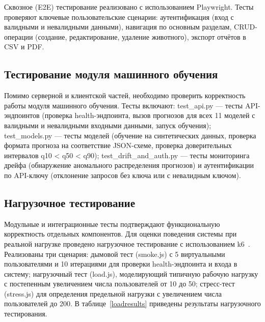 Сквозное (E2E) тестирование реализовано с использованием Playwright. Тесты проверяют ключевые пользовательские сценарии: аутентификация (вход с валидными и невалидными данными), навигация по основным разделам, CRUD-операции (создание, редактирование, удаление животного), экспорт отчётов в CSV и PDF.

\subsection{Тестирование модуля машинного обучения}

Помимо серверной и клиентской частей, необходимо проверить корректность работы модуля машинного обучения. Тесты включают: test\_api.py --- тесты API-эндпоинтов (проверка health-эндпоинта, вызов прогнозов для всех 11 моделей с валидными и невалидными входными данными, запуск обучения); test\_models.py --- тесты моделей (обучение на синтетических данных, проверка формата прогноза на соответствие JSON-схеме, проверка доверительных интервалов q10 < q50 < q90); test\_drift\_and\_auth.py --- тесты мониторинга дрейфа (обнаружение аномального распределения прогнозов) и аутентификации по API-ключу (отклонение запросов без ключа или с невалидным ключом).

\subsection{Нагрузочное тестирование}

Модульные и интеграционные тесты подтверждают функциональную корректность отдельных компонентов. Для оценки поведения системы при реальной нагрузке проведено нагрузочное тестирование с использованием k6~\cite{K6}. Реализованы три сценария: дымовой тест (smoke.js) с 5 виртуальными пользователями и 10 итерациями для проверки health-эндпоинта и входа в систему; нагрузочный тест (load.js), моделирующий типичную рабочую нагрузку с постепенным увеличением числа пользователей от 10 до 50; стресс-тест (stress.js) для определения предельной нагрузки с увеличением числа пользователей до 200. В таблице~\ref{loadresults} приведены результаты нагрузочного тестирования.

